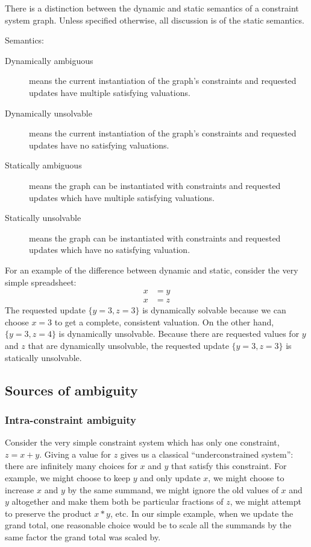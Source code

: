 There is a distinction between the dynamic and static semantics of a
constraint system graph. Unless specified otherwise, all discussion is of
the static semantics.
\begin{definition} Semantics:
    \begin{description}
        \item[Dynamically ambiguous] means the current instantiation of the
            graph's constraints and requested updates have multiple
            satisfying valuations.
        \item[Dynamically unsolvable] means the current instantiation of the
            graph's constraints and requested updates have no satisfying
            valuations.
        \item[Statically ambiguous] means the graph can be instantiated with
            constraints and requested updates which have multiple satisfying
            valuations.
        \item[Statically unsolvable] means the graph can be instantiated
            with constraints and requested updates which have no satisfying
            valuation.
    \end{description}
\end{definition}
For an example of the difference between dynamic and static, consider the
very simple spreadsheet:
\begin{align*}
    x &= y \\
    x &= z
\end{align*}
The requested update $\{y=3,z=3\}$ is dynamically solvable because we can
choose $x=3$ to get a complete, consistent valuation. On the other hand,
$\{y=3,z=4\}$ is dynamically unsolvable. Because there are requested values
for $y$ and $z$ that are dynamically unsolvable, the requested update
$\{y=3,z=3\}$ is statically unsolvable.

\subsection{Sources of ambiguity}
\subsubsection{Intra-constraint ambiguity}
Consider the very simple constraint system which has only one constraint, $z
= x+y$. Giving a value for $z$ gives us a classical ``underconstrained
system'': there are infinitely many choices for $x$ and $y$ that satisfy
this constraint. For example, we might choose to keep $y$ and only update
$x$, we might choose to increase $x$ and $y$ by the same summand, we might
ignore the old values of $x$ and $y$ altogether and make them both be
particular fractions of $z$, we might attempt to preserve the product $x*y$,
etc. In our simple example, when we update the grand total, one reasonable
choice would be to scale all the summands by the same factor the grand total
was scaled by.

